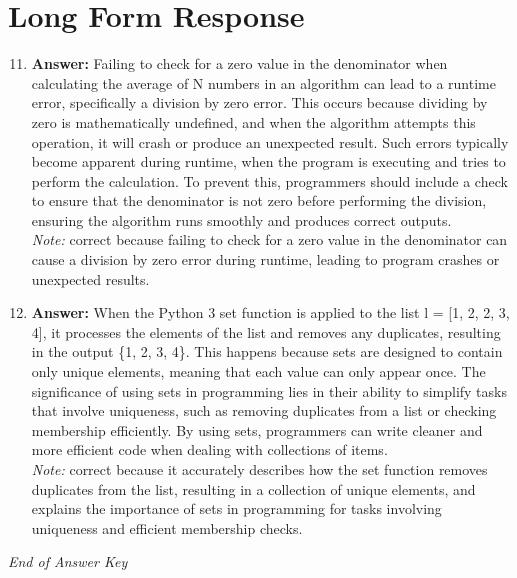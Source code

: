 \documentclass[12pt]{article}
\begin{document}
\section*{Long Form Response}
\begin{enumerate}[label=\arabic*.]
\setcounter{enumi}{10}
\item \textbf{Answer:} Failing to check for a zero value in the denominator when calculating the average of N numbers in an algorithm can lead to a runtime error, specifically a division by zero error. This occurs because dividing by zero is mathematically undefined, and when the algorithm attempts this operation, it will crash or produce an unexpected result. Such errors typically become apparent during runtime, when the program is executing and tries to perform the calculation. To prevent this, programmers should include a check to ensure that the denominator is not zero before performing the division, ensuring the algorithm runs smoothly and produces correct outputs.
\\ \textit{Note:} correct because failing to check for a zero value in the denominator can cause a division by zero error during runtime, leading to program crashes or unexpected results.
\item \textbf{Answer:} When the Python 3 set function is applied to the list l = [1, 2, 2, 3, 4], it processes the elements of the list and removes any duplicates, resulting in the output \{1, 2, 3, 4\}. This happens because sets are designed to contain only unique elements, meaning that each value can only appear once. The significance of using sets in programming lies in their ability to simplify tasks that involve uniqueness, such as removing duplicates from a list or checking membership efficiently. By using sets, programmers can write cleaner and more efficient code when dealing with collections of items.
\\ \textit{Note:} correct because it accurately describes how the set function removes duplicates from the list, resulting in a collection of unique elements, and explains the importance of sets in programming for tasks involving uniqueness and efficient membership checks.
\end{enumerate}

\vfill
\noindent\textit{End of Answer Key}
\end{document}
